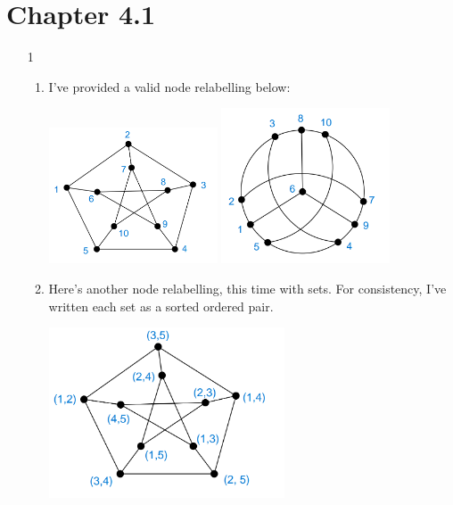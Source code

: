 \documentclass[12pt]{article}
\begin{document}
\section{Chapter 4.1}

\begin{enumerate}
      \item[1] \begin{enumerate}
                  \item I've provided a valid node relabelling below:
                        \begin{center}
                              \hfill
                              \includegraphics[width=5cm]{img/hw1/iso1}
                              \hfill
                              \includegraphics[width=5cm]{img/hw1/iso2}
                              \hfill \mbox{}
                        \end{center}
                  \item Here's another node relabelling, this time with sets.
                        For consistency, I've written each set as a sorted ordered pair.
                        \begin{center}
                              \includegraphics[width=7cm]{img/hw1/iso3}

\end{center}
\end{enumerate}
\end{enumerate}
\end{document}
